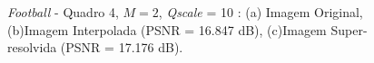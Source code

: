 \begin{figure}[H]
    \centering
    \qquad
	

    \caption{\textit{Football} - Quadro 4, $M = 2$, \textit{Qscale} = 10 : (a) Imagem Original, (b)Imagem Interpolada (PSNR = 16.847 dB), (c)Imagem Super-resolvida (PSNR = 17.176 dB).}
	    
    \label{fig:2}
\end{figure}

